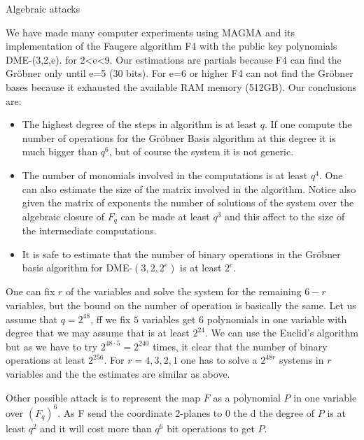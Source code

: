 \documentclass[12pt,a4paper]{amsart}
\theoremstyle{remark}
\theoremstyle{definition}
\begin{document}
Algebraic attacks


We have made many computer experiments using MAGMA and its implementation of the Faugere algorithm F4 with the public key polynomials 
DME-(3,2,e). for 2<e<9. Our estimations are partials because F4 can find the Gr{\"o}bner only until e=5 (30 bits). For  e=6 or higher 
F4 can not find the Gr{\"o}bner bases because it exhausted the available RAM memory (512GB). Our conclusions are:

\begin{itemize}
 \item The highest degree of the steps in algorithm is at least $q$. If one compute the number of operations  for the Gr{\"o}bner Basis algorithm
 at this degree it is much bigger than $q^6$, but of course the system it is not generic.
 \item The number of monomials involved in the computations is at least $q^4$. One can also estimate the   size of the matrix involved 
 in the algorithm. Notice also given the matrix of exponents   the number of solutions of the system over the algebraic closure of 
 $F_q$ can be made at least $q^3$ and this affect to the size of the intermediate computations. 
 \item It is safe to estimate that the number of binary operations in the Gr{\"o}bner basis algorithm for DME-$(3,2,2^e)$ is at least $2^e$.
 
\end{itemize}

One can fix $r$ of the variables and solve the system for the remaining $6-r$ variables, but the bound on the number of operation is 
basically the same. Let us assume that $q=2^{48}$,  ff we fix $5$ variables get 6 polynomials in one variable with degree that we may 
assume that is at least $2^{24}$. We can use the Euclid's algorithm but as we have to try $2^{48\cdot 5}=2^{240}$ times, it clear that the 
number of binary operations at least $2^{256}.$
For $r=4,3,2,1$ one has to solve a $2^{48r}$ systems in $r$ variables and the the estimates are similar as above.

Other possible attack is to represent the map $F$ as a  polynomial $P$ in one variable over $(F_q)^6$.  As F send the coordinate $2$-planes to $0$ the d
the degree of $P$ is at least $q^2$ and it will cost more than $q^6$ bit operations to get $P.$
\end{document}
